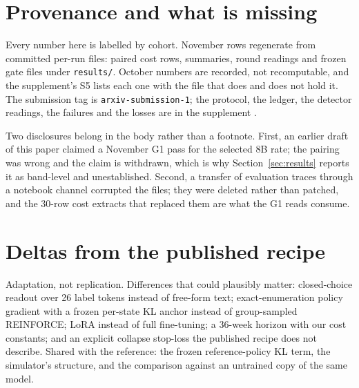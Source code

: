 \documentclass[11pt]{article}
\begin{document}
\section{Provenance and what is missing}\label{sec:prov}

Every number here is labelled by cohort. November rows regenerate from committed per-run files:
paired cost rows, summaries, round readings and frozen gate files under \texttt{results/}. October
numbers are recorded, not recomputable, and the supplement's S5 lists each one with the file that does
and does not hold it. The submission tag is \texttt{arxiv-submission-1}; the protocol, the ledger, the
detector readings, the failures and the losses are in the supplement \cite{supplement}.

Two disclosures belong in the body rather than a footnote. First, an earlier draft of this paper
claimed a November G1 pass for the selected 8B rate; the pairing was wrong and the claim is withdrawn,
which is why Section~\ref{sec:results} reports it as band-level and unestablished. Second, a transfer of
evaluation traces through a notebook channel corrupted the files; they were deleted rather than patched,
and the 30-row cost extracts that replaced them are what the G1 reads consume.

\appendix
\section{Deltas from the published recipe}\label{app:deltas}

Adaptation, not replication. Differences that could plausibly matter: closed-choice readout over 26
label tokens instead of free-form text; exact-enumeration policy gradient with a frozen per-state KL
anchor instead of group-sampled REINFORCE; LoRA instead of full fine-tuning; a 36-week horizon with our
cost constants; and an explicit collapse stop-loss the published recipe does not describe. Shared with
the reference: the frozen reference-policy KL term, the simulator's structure, and the comparison
against an untrained copy of the same model.
\end{document}
